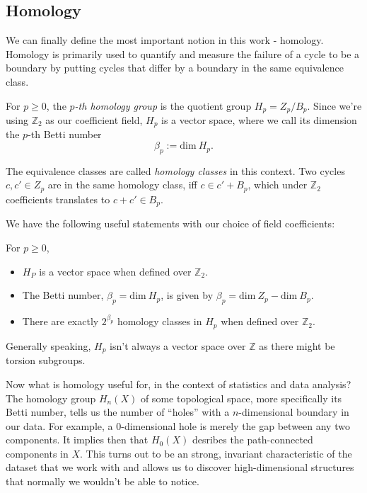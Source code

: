 \subsection{Homology}

We can finally define the most important notion in this work - homology. Homology is primarily used to quantify and measure the failure of a cycle to be a boundary by putting cycles that differ by a boundary in the same equivalence class.

\begin{definition}
  For $p \geq 0$, the \textit{$p$-th homology group} is the quotient group $H_{p} = Z_{p} / B_{p}$. Since we're using $\mathbb{Z}_{2}$ as our coefficient field, $H_{p}$ is a vector space, where we call its dimension the $p$-th Betti number
  \begin{equation*}
    \beta_{p} := \text{dim} \: H_{p}.
  \end{equation*}
\end{definition}

The equivalence classes are called \textit{homology classes} in this context. Two cycles $c, c' \in Z_{p}$ are in the same homology class, iff $c \in c' + B_{p}$, which under $\mathbb{Z}_{2}$ coefficients translates to $c + c' \in B_{p}$.

We have the following useful statements with our choice of field coefficients:

\begin{theorem}
For $p \geq 0$,
  \begin{itemize}
    \item $H_{P}$ is a vector space when defined over $\mathbb{Z}_{2}$.
    \item The Betti number, $\beta_{p} = \text{dim}\:H_{p}$, is given by $\beta_{p} = \text{dim}\:Z_{p} - \text{dim}\:B_{p}$.
    \item There are exactly $2^{\beta_{p}}$ homology classes in $H_{p}$ when defined over $\mathbb{Z}_{2}$.
  \end{itemize}
\end{theorem}

Generally speaking, $H_{p}$ isn't always a vector space over $\mathbb{Z}$ as there might be torsion subgroups.

Now what is homology useful for, in the context of statistics and data analysis? The homology group $H_{n}(X)$ of some topological space, more specifically its Betti number, tells us the number of ``holes'' with a $n$-dimensional boundary in our data. For example, a $0$-dimensional hole is merely the gap between any two components. It implies then that $H_{0}(X)$ desribes the path-connected components in $X$. This turns out to be an strong, invariant characteristic of the dataset that we work with and allows us to discover high-dimensional structures that normally we wouldn't be able to notice.

